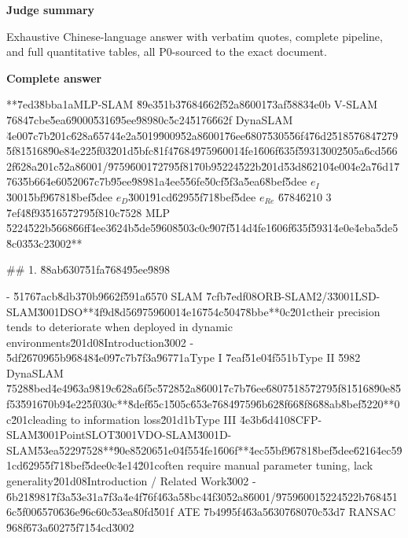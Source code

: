 \documentclass[10pt]{article}
\begin{document}
\textbf{Judge summary}
\begin{EvidenceText}
Exhaustive Chinese-language answer with verbatim quotes, complete pipeline, and full quantitative tables, all P0-sourced to the exact document.
\end{EvidenceText}

\textbf{Complete answer}
\begin{AnswerText}
**\u7ed3\u8bba\uff1aMLP-SLAM \u89e3\u51b3\u7684\u662f\u52a8\u6001\u73af\u5883\u4e0b V-SLAM \u7684\u7cbe\u5ea6\u9000\u5316\u95ee\u9898\uff0c\u5c24\u5176\u662f DynaSLAM \u4e00\u7c7b\u201c\u628a\u6574\u4e2a\u5019\u9009\u52a8\u6001\u76ee\u6807\u5305\u56f4\u76d2\u5185\u7684\u7279\u5f81\u5168\u90e8\u4e22\u5f03\u201d\u5bfc\u81f4\u7684\u9759\u6001\u4fe1\u606f\u635f\u5931\u3002\u505a\u6cd5\u662f\u628a\u201c\u52a8\u6001/\u9759\u6001\u7279\u5f81\u70b9\u5224\u522b\u201d\u53d8\u6210\u4e00\u4e2a\u76d1\u7763\u5b66\u4e60\u5206\u7c7b\u95ee\u9898\uff1a\u4ee5\u56fe\u50cf\u5f3a\u5ea6\u8bef\u5dee $e_I$\u3001\u5bf9\u6781\u8bef\u5dee $e_D$\u3001\u91cd\u6295\u5f71\u8bef\u5dee $e_{Re}$ \u6784\u6210 3 \u7ef4\u8f93\u5165\u7279\u5f81\uff0c\u7528 MLP \u5224\u522b\u5668\u66ff\u4ee3\u624b\u5de5\u9608\u503c\uff0c\u907f\u514d\u4fe1\u606f\u635f\u5931\u4e0e\u4eba\u5de5\u8c03\u53c2\u3002**

## 1. \u88ab\u6307\u51fa\u7684\u95ee\u9898

- \u5176\u7acb\u8db3\u70b9\u662f\u591a\u6570 SLAM \u7cfb\u7edf\uff08ORB-SLAM2/3\u3001LSD-SLAM\u3001DSO**\u4f9d\u8d56\u9759\u6001\u4e16\u754c\u5047\u8bbe**\uff0c\u201ctheir precision tends to deteriorate when deployed in dynamic environments\u201d\uff08Introduction\u3002
- \u5df2\u6709\u65b9\u6848\u4e09\u7c7b\u7f3a\u9677\uff1aType I \u7eaf\u51e0\u4f55\uff1bType II \u5982 DynaSLAM \u7528\u8bed\u4e49\u63a9\u819c\u628a\u6f5c\u5728\u52a8\u6001\u7c7b\u76ee\u6807\u5185\u7279\u5f81\u5168\u90e8\u5f53\u5916\u70b9\u4e22\u5f03\uff0c**\u8def\u65c1\u505c\u653e\u7684\u9759\u6b62\u8f66\u8f86\u88ab\u8bef\u5220**\uff0c\u201cleading to information loss\u201d\uff1bType III \u4e3b\u6d41\uff08CFP-SLAM\u3001PointSLOT\u3001VDO-SLAM\u3001D-SLAM\u53ea\u5229\u7528**\u90e8\u5206\u51e0\u4f55\u4fe1\u606f**\u4ec5\u5bf9\u6781\u8bef\u5dee\u6216\u4ec5\u91cd\u6295\u5f71\u8bef\u5dee\uff0c\u4e14\u201coften require manual parameter tuning, lack generality\u201d\uff08Introduction / Related Work\u3002
- \u6b21\u8981\u7f3a\u53e3\uff1a\u7f3a\u4e4f\u76f4\u63a5\u8bc4\u4f30\u52a8\u6001/\u9759\u6001\u5224\u522b\u7684\u516c\u5f00\u6570\u636e\u96c6\uff0c\u53ea\u80fd\u501f ATE \u7b49\u95f4\u63a5\u6307\u6807\uff0c\u53d7 RANSAC \u968f\u673a\u6027\u5f71\u54cd\u3002


\end{AnswerText}
\end{document}
